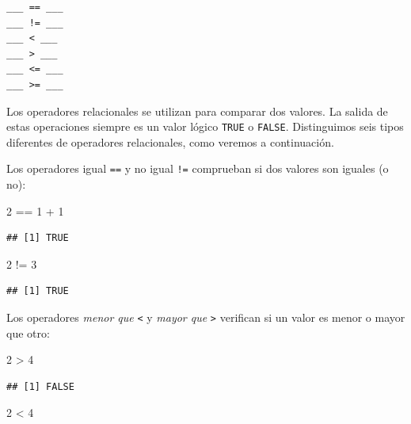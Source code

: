 \documentclass[
]{book}
\newenvironment{Shaded}{\begin{snugshade}}{\end{snugshade}}
\newcommand{\DecValTok}[1]{\textcolor[rgb]{0.00,0.00,0.81}{#1}}
\newcommand{\SpecialCharTok}[1]{\textcolor[rgb]{0.00,0.00,0.00}{#1}}
\begin{document}
\begin{verbatim}
___ == ___
___ != ___
___ < ___
___ > ___
___ <= ___
___ >= ___
\end{verbatim}

Los operadores relacionales se utilizan para comparar dos valores. La salida de estas operaciones siempre es un valor lógico \texttt{TRUE} o \texttt{FALSE}. Distinguimos seis tipos diferentes de operadores relacionales, como veremos a continuación.

Los operadores igual \texttt{==} y no igual \texttt{!=} comprueban si dos valores son iguales (o no):

\begin{Shaded}
\begin{Highlighting}[]
\DecValTok{2} \SpecialCharTok{==} \DecValTok{1} \SpecialCharTok{+} \DecValTok{1}
\end{Highlighting}
\end{Shaded}

\begin{verbatim}
## [1] TRUE
\end{verbatim}

\begin{Shaded}
\begin{Highlighting}[]
\DecValTok{2} \SpecialCharTok{!=} \DecValTok{3}
\end{Highlighting}
\end{Shaded}

\begin{verbatim}
## [1] TRUE
\end{verbatim}

Los operadores \emph{menor que} \texttt{\textless{}} y \emph{mayor que} \texttt{\textgreater{}} verifican si un valor es menor o mayor que otro:

\begin{Shaded}
\begin{Highlighting}[]
\DecValTok{2} \SpecialCharTok{\textgreater{}} \DecValTok{4}
\end{Highlighting}
\end{Shaded}

\begin{verbatim}
## [1] FALSE
\end{verbatim}

\begin{Shaded}
\begin{Highlighting}[]
\DecValTok{2} \SpecialCharTok{\textless{}} \DecValTok{4}
\end{Highlighting}
\end{Shaded}
\end{document}
